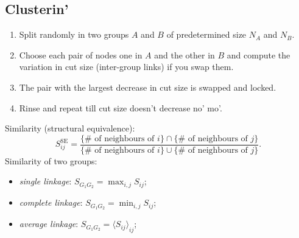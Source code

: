 \documentclass[a4paper,9pt]{extarticle}
\begin{document}
\begin{multicols*}{2}
		\subsection{Clusterin'}
		\begin{riquadro}
			\begin{enumerate}
				\item Split randomly in two groups $A$ and $B$ of predetermined size $N_{A}$ and $N_{B}$.
				\item Choose each pair of nodes one in $A$ and the other in $B$ and compute the variation in cut size (inter-group links) if you swap them.
				\item The pair with the largest decrease in cut size is swapped and locked.
				\item Rinse and repeat till cut size doesn't decrease no' mo'.
			\end{enumerate}
		\end{riquadro}
		Similarity (structural equivalence):
		\begin{equation*}
			S^{\text{SE}}_{ij}=\frac{\{\text{$\#$ of neighbours of $i$}\}\cap\{\text{$\#$ of neighbours of $j$}\}}{\{\text{$\#$ of neighbours of $i$}\}\cup\{\text{$\#$ of neighbours of $j$}\}}.
		\end{equation*}
		Similarity of two groups:
		\begin{itemize}
			\item \textit{single linkage}: $S_{G_{1}G_{2}}=\max_{i,j}S_{ij}$;
			\item \textit{complete linkage}: $S_{G_{1}G_{2}}=\min_{i,j}S_{ij}$;
			\item \textit{average linkage}: $S_{G_{1}G_{2}}={\langle S_{ij}\rangle}_{ij}$;
		\end{itemize}

\end{multicols*}
\end{document}
